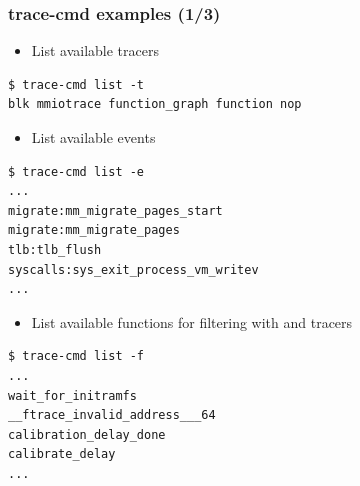 \begin{frame}[fragile]
  \frametitle{trace-cmd examples (1/3)}
  \begin{itemize}
    \item List available tracers
  \end{itemize}
  \begin{block}{}
    \begin{verbatim}
$ trace-cmd list -t
blk mmiotrace function_graph function nop
    \end{verbatim}
  \end{block}
  \begin{itemize}
    \item List available events
  \end{itemize}
  \begin{block}{}
    \begin{verbatim}
$ trace-cmd list -e
...
migrate:mm_migrate_pages_start
migrate:mm_migrate_pages
tlb:tlb_flush
syscalls:sys_exit_process_vm_writev
...
    \end{verbatim}
  \end{block}
  
  \begin{itemize}
    \item List available functions for filtering with  and
         tracers
  \end{itemize}
  \begin{block}{}
    \begin{verbatim}
$ trace-cmd list -f
...
wait_for_initramfs
__ftrace_invalid_address___64
calibration_delay_done
calibrate_delay
...
    \end{verbatim}
  \end{block}
\end{frame}

